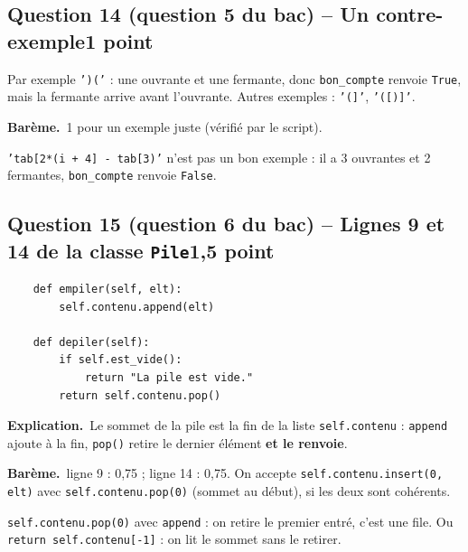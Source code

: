 \documentclass[11pt, a4paper]{exam}
\newcommand{\code}[1]{\texttt{#1}}
\newcommand{\Qt}[2]{\par\needspace{10\baselineskip}\subsection*{#1\hfill{\normalfont\small #2}}}
\newcommand{\bareme}[1]{\par\noindent\textbf{Barème.}\ #1\par\smallskip}
\newcommand{\explication}{\noindent\textbf{Explication.}\ }
\begin{document}
\Qt{Question 14 (question 5 du bac) -- Un contre-exemple}{1 point}
\begin{reponse}
Par exemple \code{')('} : une ouvrante et une fermante, donc \code{bon\_compte} renvoie \code{True}, mais la fermante arrive avant l'ouvrante. Autres exemples : \code{'(]'}, \code{'([)]'}.
\end{reponse}
\bareme{1 pour un exemple juste (vérifié par le script).}
\begin{erreur}
\code{'tab[2*(i + 4] - tab[3)'} n'est pas un bon exemple : il a 3 ouvrantes et 2 fermantes, \code{bon\_compte} renvoie \code{False}.
\end{erreur}

\Qt{Question 15 (question 6 du bac) -- Lignes 9 et 14 de la classe \code{Pile}}{1,5 point}
\begin{reponse}
\begin{lstlisting}
    def empiler(self, elt):
        self.contenu.append(elt)

    def depiler(self):
        if self.est_vide():
            return "La pile est vide."
        return self.contenu.pop()
\end{lstlisting}
\end{reponse}
\explication Le sommet de la pile est la fin de la liste \code{self.contenu} : \code{append} ajoute à la fin, \code{pop()} retire le dernier élément \textbf{et le renvoie}.
\bareme{ligne 9 : 0,75 ; ligne 14 : 0,75. On accepte \code{self.contenu.insert(0, elt)} avec \code{self.contenu.pop(0)} (sommet au début), si les deux sont cohérents.}
\begin{erreur}
\code{self.contenu.pop(0)} avec \code{append} : on retire le premier entré, c'est une file. Ou \code{return self.contenu[-1]} : on lit le sommet sans le retirer.
\end{erreur}
\end{document}
